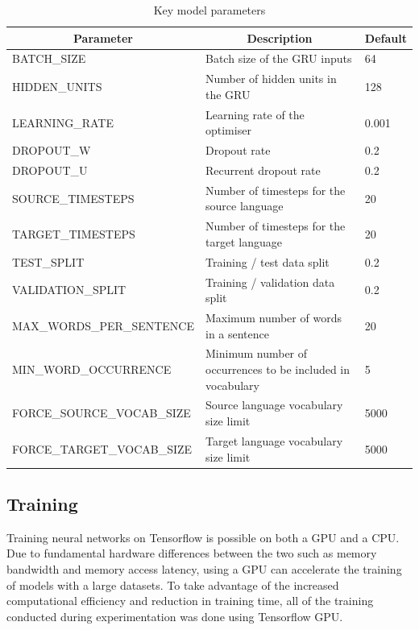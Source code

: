 

\begin{table}[!ht]
\centering
\small
\begin{tabular}{|l|p{6.6cm}|l|}
\hline
\multicolumn{1}{|c|}{\textbf{Parameter}} & \multicolumn{1}{c|}{\textbf{Description}}                                       & \textbf{Default} \\ \hline
BATCH\_SIZE                & Batch size of the \acrshort{GRU} inputs            & 64    \\ \hline
HIDDEN\_UNITS              & Number of hidden units in the \acrshort{GRU}       & 128   \\ \hline
LEARNING\_RATE             & Learning rate of the optimiser                     & 0.001 \\ \hline
DROPOUT\_W                 & Dropout rate                                       & 0.2   \\ \hline
DROPOUT\_U                 & Recurrent dropout rate                             & 0.2   \\ \hline
SOURCE\_TIMESTEPS          & Number of timesteps for the source language        & 20    \\ \hline
TARGET\_TIMESTEPS          & Number of timesteps for the target language        & 20    \\ \hline
TEST\_SPLIT                & Training / test data split                         & 0.2   \\ \hline
VALIDATION\_SPLIT          & Training / validation data split                   & 0.2   \\ \hline
MAX\_WORDS\_PER\_SENTENCE  & Maximum number of words in a sentence              & 20    \\ \hline
MIN\_WORD\_OCCURRENCE      & Minimum number of occurrences to be included in vocabulary & 5 \\ \hline
FORCE\_SOURCE\_VOCAB\_SIZE & Source language vocabulary size limit              & 5000 \\ \hline
FORCE\_TARGET\_VOCAB\_SIZE & Target language vocabulary size limit              & 5000 \\ \hline
\end{tabular}
\captionsetup{justification=centering}
\caption{Key model parameters}
\label{tab:model-parameters}
\end{table}


\subsection{Training}
Training neural networks on Tensorflow is possible on both a GPU and a CPU. Due to fundamental hardware differences between the two such as memory bandwidth and memory access latency, using a GPU can accelerate the training of models with a large datasets. To take advantage of the increased computational efficiency and reduction in training time, all of the training conducted during experimentation was done using Tensorflow GPU.

